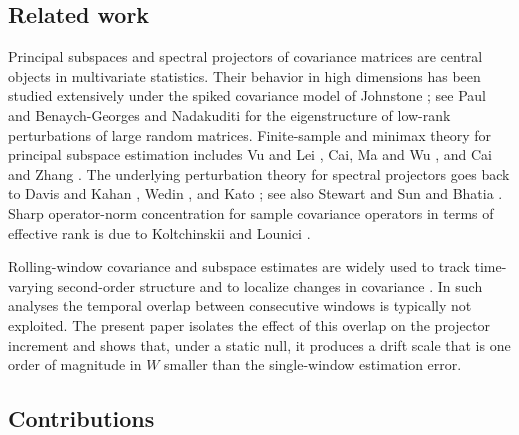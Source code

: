 \documentclass[11pt]{article}
\theoremstyle{tightplain}
\theoremstyle{tightdef}
\begin{document}
\subsection{Related work}

Principal subspaces and spectral projectors of covariance matrices are central
objects in multivariate statistics. Their behavior in high dimensions has been
studied extensively under the spiked covariance model of Johnstone
\cite{Johnstone2001}; see Paul \cite{Paul2007} and Benaych-Georges and
Nadakuditi \cite{BenaychNadakuditi2011} for the eigenstructure of low-rank
perturbations of large random matrices. Finite-sample and minimax theory for
principal subspace estimation includes Vu and Lei \cite{VuLei2013}, Cai, Ma and
Wu \cite{CaiMaWu2013}, and Cai and Zhang \cite{CaiZhang2018}. The underlying
perturbation theory for spectral projectors goes back to Davis and Kahan
\cite{DavisKahan1970}, Wedin \cite{Wedin1972}, and Kato \cite{Kato1995}; see
also Stewart and Sun \cite{StewartSun1990} and Bhatia \cite{Bhatia1997}. Sharp
operator-norm concentration for sample covariance operators in terms of
effective rank is due to Koltchinskii and Lounici \cite{KoltchinskiiLounici2017}.

Rolling-window covariance and subspace estimates are widely used to track
time-varying second-order structure and to localize changes in covariance
\cite{AueEtAl2009,WangYuRinaldo2021}. In such analyses the temporal overlap
between consecutive windows is typically not exploited. The present paper
isolates the effect of this overlap on the projector increment and shows that,
under a static null, it produces a drift scale that is one order of magnitude
in $W$ smaller than the single-window estimation error.

\subsection{Contributions}
\end{document}
